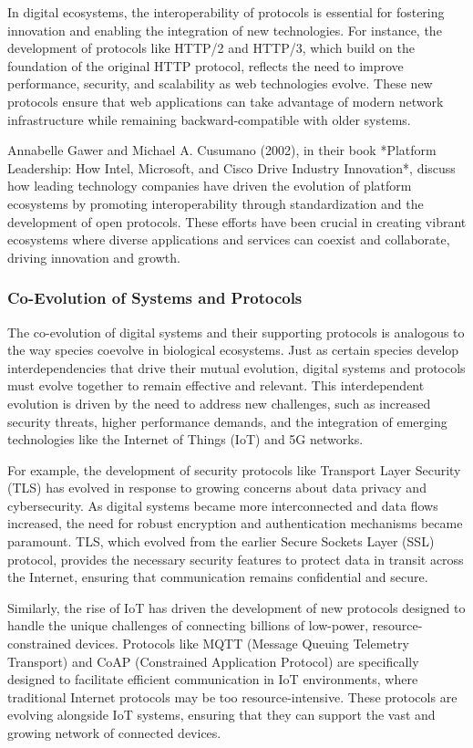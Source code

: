 \documentclass[12pt,twoside]{article}
\begin{document}
In digital ecosystems, the interoperability of protocols is essential for fostering innovation and enabling the integration of new technologies. For instance, the development of protocols like HTTP/2 and HTTP/3, which build on the foundation of the original HTTP protocol, reflects the need to improve performance, security, and scalability as web technologies evolve. These new protocols ensure that web applications can take advantage of modern network infrastructure while remaining backward-compatible with older systems.

Annabelle Gawer and Michael A. Cusumano (2002), in their book *Platform Leadership: How Intel, Microsoft, and Cisco Drive Industry Innovation*, discuss how leading technology companies have driven the evolution of platform ecosystems by promoting interoperability through standardization and the development of open protocols. These efforts have been crucial in creating vibrant ecosystems where diverse applications and services can coexist and collaborate, driving innovation and growth.

\subsubsection{Co-Evolution of Systems and Protocols}

The co-evolution of digital systems and their supporting protocols is analogous to the way species coevolve in biological ecosystems. Just as certain species develop interdependencies that drive their mutual evolution, digital systems and protocols must evolve together to remain effective and relevant. This interdependent evolution is driven by the need to address new challenges, such as increased security threats, higher performance demands, and the integration of emerging technologies like the Internet of Things (IoT) and 5G networks.

For example, the development of security protocols like Transport Layer Security (TLS) has evolved in response to growing concerns about data privacy and cybersecurity. As digital systems became more interconnected and data flows increased, the need for robust encryption and authentication mechanisms became paramount. TLS, which evolved from the earlier Secure Sockets Layer (SSL) protocol, provides the necessary security features to protect data in transit across the Internet, ensuring that communication remains confidential and secure.

Similarly, the rise of IoT has driven the development of new protocols designed to handle the unique challenges of connecting billions of low-power, resource-constrained devices. Protocols like MQTT (Message Queuing Telemetry Transport) and CoAP (Constrained Application Protocol) are specifically designed to facilitate efficient communication in IoT environments, where traditional Internet protocols may be too resource-intensive. These protocols are evolving alongside IoT systems, ensuring that they can support the vast and growing network of connected devices.
\end{document}
